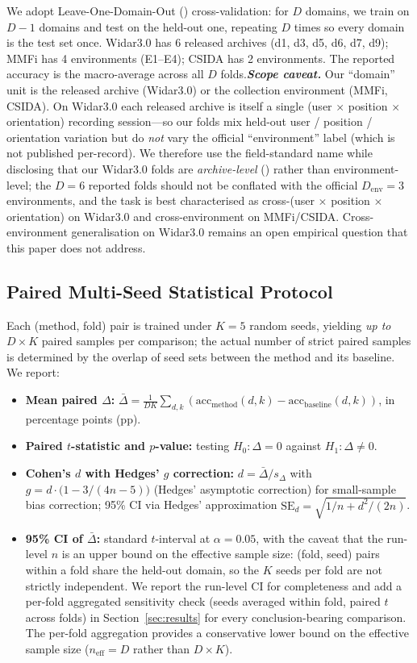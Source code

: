 \documentclass[11pt]{article}
\theoremstyle{definition}
\newcommand{\LODO}{\text{LODO}}
\newcommand{\LOAO}{\text{LOAO}}
\begin{document}
We adopt Leave-One-Domain-Out (\LODO) cross-validation: for $D$ domains, we train on $D-1$ domains and test on the held-out one, repeating $D$ times so every domain is the test set once. Widar3.0 has 6 released archives (d1, d3, d5, d6, d7, d9); MMFi has 4 environments (E1--E4); CSIDA has 2 environments. The reported accuracy is the macro-average across all $D$ folds.\textbf{\emph{Scope caveat.}} Our ``domain'' unit is the released archive (Widar3.0) or the collection environment (MMFi, CSIDA). On Widar3.0 each released archive is itself a single (user $\times$ position $\times$ orientation) recording session---so our \LODO{} folds mix held-out user / position / orientation variation but do \emph{not} vary the official ``environment'' label (which is not published per-record). We therefore use the field-standard name \LODO{} while disclosing that our Widar3.0 folds are \emph{archive-level} (\LOAO) rather than environment-level; the $D = 6$ reported folds should not be conflated with the official $D_{\text{env}} = 3$ environments, and the task is best characterised as cross-(user $\times$ position $\times$ orientation) on Widar3.0 and cross-environment on MMFi/CSIDA. Cross-environment generalisation on Widar3.0 remains an open empirical question that this paper does not address.

\subsection{Paired Multi-Seed Statistical Protocol}

Each (method, fold) pair is trained under $K = 5$ random seeds, yielding \emph{up to} $D \times K$ paired samples per comparison; the actual number of strict paired samples is determined by the overlap of seed sets between the method and its baseline. We report:
\begin{itemize}
    \item \textbf{Mean paired $\Delta$:} $\bar{\Delta} = \frac{1}{DK} \sum_{d,k} (\text{acc}_{\text{method}}(d,k) - \text{acc}_{\text{baseline}}(d,k))$, in percentage points (pp).
    \item \textbf{Paired $t$-statistic and $p$-value:} testing $H_0: \Delta = 0$ against $H_1: \Delta \neq 0$.
    \item \textbf{Cohen's $d$ with Hedges' $g$ correction:} $d = \bar{\Delta} / s_{\Delta}$ with $g = d \cdot \bigl(1 - 3/(4n - 5)\bigr)$ (Hedges' asymptotic correction) for small-sample bias correction; 95\% CI via Hedges' approximation $\text{SE}_d = \sqrt{1/n + d^2 / (2n)}$.
    \item \textbf{95\% CI of $\bar{\Delta}$:} standard $t$-interval at $\alpha = 0.05$, with the caveat that the run-level $n$ is an upper bound on the effective sample size: (fold, seed) pairs within a fold share the held-out domain, so the $K$ seeds per fold are not strictly independent. We report the run-level CI for completeness and add a per-fold aggregated sensitivity check (seeds averaged within fold, paired $t$ across folds) in Section~\ref{sec:results} for every conclusion-bearing comparison. The per-fold aggregation provides a conservative lower bound on the effective sample size ($n_\text{eff} = D$ rather than $D \times K$).
\end{itemize}
\end{document}

